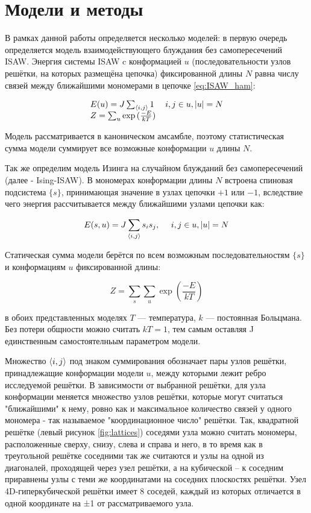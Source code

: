 \section{Модели и методы}

В рамках данной работы определяется несколько моделей: 
в первую очередь определяется модель взаимодействующего блуждания без самопересечений ISAW. 
Энергия системы ISAW c конформацией $u$ (последовательности узлов решётки, на которых размещёна цепочка) 
фиксированной длины $N$ равна числу связей между ближайшими мономерами в цепочке \eqref{eq:ISAW_ham}:

\begin{equation}
\begin{array}{l}
\label{eq:ISAW_ham}
E(u) = J \sum_{\langle i, j \rangle} 1\ \ \ \ i,j \in u, |u|=N \\
Z = \sum_u \exp{(\frac{-E}{kT})}
\end{array}
\end{equation}

Модель рассматривается в каноническом амсамбле, поэтому статистическая сумма модели суммирует все возможные конформации $u$ длины $N$.

Так же определим модель Изинга на случайном блужданий без самопересечений (далее - Ising-ISAW).
В мономерах конформации длины $N$ встроена спиновая подсистема $\{s\}$, 
принимающая значение в узлах цепочки $+1$ или $-1$, вследствие чего энергия рассчитывается между ближайшими узлами цепочки как:

\begin{equation}
\label{eq:IsISAW_ham}
E(s,u) = J \sum_{\langle i, j \rangle} s_i s_j,\ \ \ \ i,j \in u, |u|=N
\end{equation}

Статическая сумма модели берётся по всем возможным последовательностям $\{s\}$ и конформациям $u$ фиксированной длины:

\begin{equation}
Z = \sum_s \sum_u \exp{(\frac{-E}{kT})}
\end{equation}

в обоих представленных моделях $T$ — температура, $k$ — постоянная Больцмана. 
Без потери общности можно считать $kT = 1$, тем самым оставляя J единственным самостоятелньым параметром модели.

Множество $\langle i, j \rangle$ под знаком суммирования обозначает пары узлов решётки, принадлежащие конформации модели $u$, между которыми лежит ребро исследуемой решётки.
В зависимости от выбранной решётки, для узла конформации меняется множество узлов решётки, 
которые могут считаться "ближайшими" к нему, ровно как и максимальное количество связей у одного мономера - так называемое "координационное число" решётки.
Так, квадратной решётке (левый рисунок \ref{fig:lattices}) соседями узла можно считать мономеры, расположенные сверху, снизу, слева и справа и него, 
в то время как в треугольной решётке соседними так же считаются и узлы на одной из диагоналей, проходящей через узел решётки,
а на кубической – к соседним приравнены узлы с теми же координатами на соседних плоскостях решётки.
Узел 4D-гиперкубической решётки имеет 8 соседей, каждый из которых отличается в одной координате на ±1 от рассматриваемого узла.

